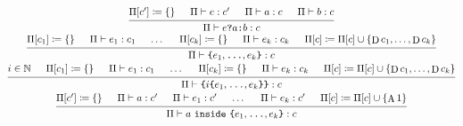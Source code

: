 \documentclass{article}
\DeclareMathOperator{\D}{D}
\DeclareMathOperator{\A}{A}
\begin{document}
\begin{spreadlines}{2em}
    \begin{gather*}
        \begin{prooftree}
            \hypo{\hypo{\Pi[c'] \coloneq \left\{\right\}}}
            \hypo{\Pi \vdash e: c'}
            \hypo{\Pi \vdash a: c}
            \hypo{\Pi \vdash b: c}
            \infer4{\Pi \vdash e \texttt{?} a \texttt{:} b: c}
        \end{prooftree}
        \\
        \begin{prooftree}
            \hypo{\hypo{\Pi[c_1] \coloneq \left\{\right\}}}
            \hypo{\Pi \vdash e_1: c_1}
            \hypo{\dots}
            \hypo{\hypo{\Pi[c_k] \coloneq \left\{\right\}}}
            \hypo{\Pi \vdash e_k: c_k}
            \hypo{\Pi[c] \coloneq \Pi[c] \cup \left\{\D c_1,\dots, \D c_k\right\}}
            \infer6{\Pi \vdash \texttt{\{}e_1, \texttt{\dots}, e_k \texttt{\}}: c}
        \end{prooftree}
        \\
        \begin{prooftree}
            \hypo{i \in \mathbb{N}}
            \hypo{\hypo{\Pi[c_1] \coloneq \left\{\right\}}}
            \hypo{\Pi \vdash e_1: c_1}
            \hypo{\dots}
            \hypo{\hypo{\Pi[c_k] \coloneq \left\{\right\}}}
            \hypo{\Pi \vdash e_k: c_k}
            \hypo{\Pi[c] \coloneq \Pi[c] \cup \left\{\D c_1,\dots, \D c_k\right\}}
            \infer7{\Pi \vdash \texttt{\{}i\texttt{\{}e_1, \texttt{\dots}, e_k \texttt{\}}\texttt{\}}: c}
        \end{prooftree}
        \\
        \begin{prooftree}
            \hypo{\hypo{\Pi[c'] \coloneq \left\{\right\}}}
            \hypo{\Pi \vdash a: c'}
            \hypo{\Pi \vdash e_1: c'}
            \hypo{\dots}
            \hypo{\Pi \vdash e_k: c'}
            \hypo{\Pi[c] \coloneq \Pi[c] \cup \left\{\A 1\right\}}
            \infer6{\Pi \vdash a~\texttt{inside}~\texttt{\{}e_1, \texttt{\dots}, e_k \texttt{\}}: c}
        \end{prooftree}
    \end{gather*}
\end{spreadlines}
\end{document}
